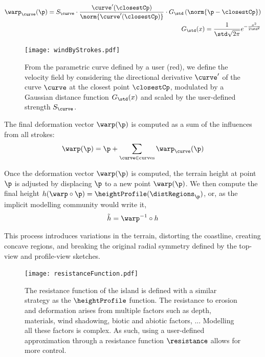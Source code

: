 \begin{align}
    \warp_\curve(\p) = S_\curve \cdot \frac{\curve'(\closestCp)}{\norm{\curve'(\closestCp)} } \cdot G_\std\left(\norm{\p - \closestCp} \right) \\
    G_\std(x) = \frac{1}{\std \sqrt{2\pi}} e^{-\frac{x^2}{2 \std^2}}
\end{align}

\begin{figure}
    \texttt{[image: windByStrokes.pdf]}
    \caption[Computation of a vector field from a single user wind stroke]{From the parametric curve defined by a user (red), we define the velocity field by considering the directional derivative $\curve'$ of the curve $\curve$ at the closest point $\closestCp$, modulated by a Gaussian distance function $G_{\std}(x)$ and scaled by the user-defined strength $S_\curve$.}
    \label{fig:coral-island-wind-from-strokes}
\end{figure}

The final deformation vector $\warp(\p)$ is computed as a sum of the influences from all strokes: 
\begin{align}
    \warp(\p) = \p + \sum_{\curve \in \text{curves}} \warp_\curve(\p) 
\end{align}

Once the deformation vector $\warp(\p)$ is computed, the terrain height at point $\p$ is adjusted by displacing $\p$ to a new point $\warp(\p)$.
We then compute the final height $h(\warp \circ \p) = \heightProfile(\distRegions_{\p})$, or, as the implicit modelling community would write it,
\begin{align}
    \Tilde{h} = \warp^{-1} \circ h
\end{align}

This process introduces variations in the terrain, distorting the coastline, creating concave regions, and breaking the original radial symmetry defined by the top-view and profile-view sketches.

\begin{figure}
    \texttt{[image: resistanceFunction.pdf]}
    \caption[Resistance function]{The resistance function of the island is defined with a similar strategy as the $\heightProfile$ function. The resistance to erosion and deformation arises from multiple factors such as depth, materials, wind shadowing, biotic and abiotic factors, ... Modelling all these factors is complex. As such, using a user-defined approximation through a resistance function $\resistance$ allows for more control.}
    \label{fig:coral-island-resistance-function}
\end{figure}

